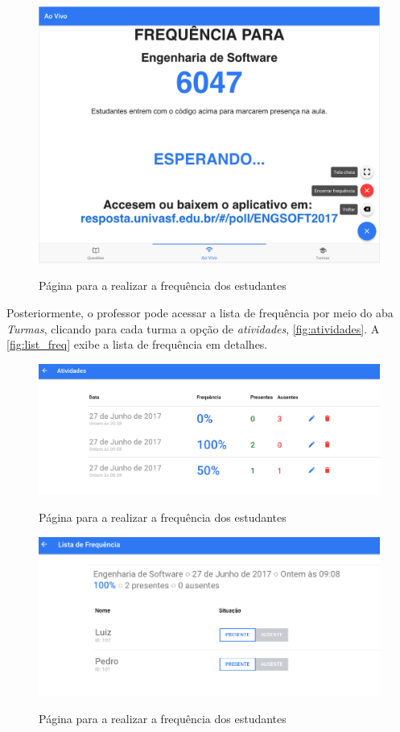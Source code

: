 \begin{figure}[ht]
  \centering
  \caption{Página para a realizar a frequência dos estudantes}
  \includegraphics[scale=.45]{imagens/telas/live_freq}
  \doautor
  \label{fig:live_freq}
\end{figure}

Posteriormente, o professor pode acessar a lista de frequência por meio do aba \textit{Turmas},
clicando para cada turma a opção de \textit{atividades}, \autoref{fig:atividades}. A \autoref{fig:list_freq} exibe a
lista de frequência em detalhes.

\begin{figure}[ht]
  \centering
  \caption{Página para a realizar a frequência dos estudantes}
  \includegraphics[scale=.45]{imagens/telas/atividades}
  \doautor
  \label{fig:atividades}
\end{figure}

\begin{figure}[ht]
  \centering
  \caption{Página para a realizar a frequência dos estudantes}
  \includegraphics[scale=.45]{imagens/telas/list_freq}
  \doautor
  \label{fig:list_freq}
\end{figure}



